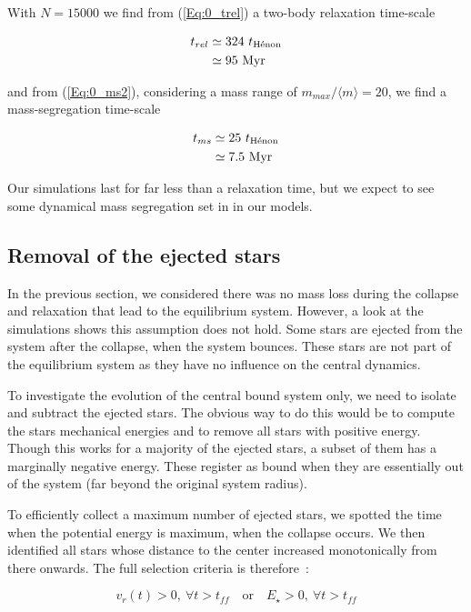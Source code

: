  With $N = 15 000$  we find from (\ref{Eq:0_trel}) a two-body relaxation time-scale

\begin{align}
t_{rel}  &\simeq 324~ t_{\textrm{H\'enon}}\\
	     &\simeq 95~ {\textrm{Myr}}
\end{align}

and from (\ref{Eq:0_ms2}), considering a mass range of $m_{max}/\langle m\rangle = 20$, we find a mass-segregation time-scale

\begin{align}
t_{ms}  &\simeq 25~ t_{\textrm{H\'enon}}\\
	    &\simeq 7.5~ {\textrm{Myr}}
\end{align}

Our simulations last for far less than a relaxation time, but we expect to see some dynamical mass segregation set in in our models.


\subsection{Removal of the ejected stars}

In the previous section, we considered there was no mass loss during the collapse and relaxation that lead to the equilibrium system. However, a look at the simulations shows this assumption does not hold. Some stars are ejected from the system after the collapse, when the system bounces. These stars are not part of the equilibrium system as they have no influence on the central dynamics.

To investigate the evolution of the central bound system only, we need to isolate and subtract the ejected stars. The obvious way to do this would be to compute the stars mechanical energies and to remove all stars with positive energy. Though this works for a majority of the ejected stars, a subset of them has a marginally negative energy. These register as bound when they are essentially out of the system (far beyond the original system radius). 

To efficiently collect a maximum number of ejected stars, we spotted the time when the potential energy is maximum, when the collapse occurs. We  then identified all stars whose distance to the center increased monotonically from there onwards. The full selection criteria is therefore~:

\begin{equation}
v_r(t) > 0,~\forall t > t_{ff}\quad \textrm{or} \quad  E_\star > 0 , ~\forall t > t_{ff}
\end{equation}
 
